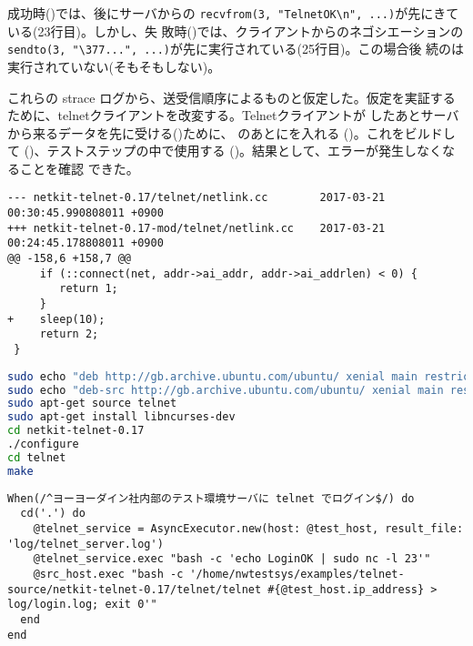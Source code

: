 成功時()では、後にサーバからの
\verb|recvfrom(3, "TelnetOK\n", ...)|が先にきている(23行目)。しかし、失
敗時()では、クライアントからのネゴシエーションの
\verb|sendto(3, "\377...", ...)|が先に実行されている(25行目)。この場合後
続のは実行されていない(そもそもしない)。

これらの strace ログから、送受信順序によるものと仮定した。仮定を実証する
ために、telnetクライアントを改変する。Telnetクライアントが
したあとサーバから来るデータを先に受ける()ために、
のあとにを入れる
()。これをビルドして
()、テストステップの中で使用する
()。結果として、エラーが発生しなくなることを確認
できた。

\begin{lstlisting}[caption=telnetクライアント改変,label=lst:modified-telnet-client]
--- netkit-telnet-0.17/telnet/netlink.cc        2017-03-21 00:30:45.990808011 +0900
+++ netkit-telnet-0.17-mod/telnet/netlink.cc    2017-03-21 00:24:45.178808011 +0900
@@ -158,6 +158,7 @@
     if (::connect(net, addr->ai_addr, addr->ai_addrlen) < 0) {
        return 1;
     }
+    sleep(10);
     return 2;
 }
\end{lstlisting}

\begin{lstlisting}[language=sh,caption=telnetクライアントのビルド手順,label=lst:howto-build-telnet]
sudo echo "deb http://gb.archive.ubuntu.com/ubuntu/ xenial main restricted" | sudo tee -a /etc/apt/sources.list
sudo echo "deb-src http://gb.archive.ubuntu.com/ubuntu/ xenial main restricted" | sudo tee -a /etc/apt/sources.list
sudo apt-get source telnet
sudo apt-get install libncurses-dev
cd netkit-telnet-0.17
./configure
cd telnet
make
\end{lstlisting}

\begin{lstlisting}[caption=改変telnetクライアントの使用,label=lst:telnet-step]
When(/^ヨーヨーダイン社内部のテスト環境サーバに telnet でログイン$/) do
  cd('.') do
    @telnet_service = AsyncExecutor.new(host: @test_host, result_file: 'log/telnet_server.log')
    @telnet_service.exec "bash -c 'echo LoginOK | sudo nc -l 23'"
    @src_host.exec "bash -c '/home/nwtestsys/examples/telnet-source/netkit-telnet-0.17/telnet/telnet #{@test_host.ip_address} > log/login.log; exit 0'"
  end
end
\end{lstlisting}

